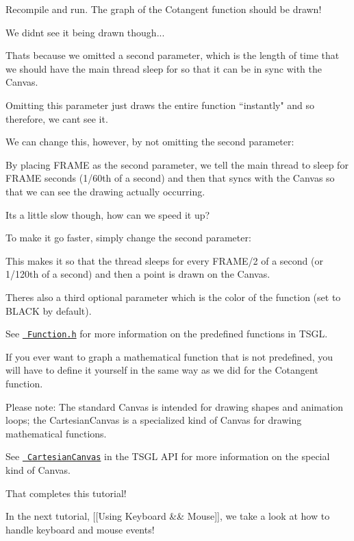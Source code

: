 Recompile and run. The graph of the {\ttfamily Cotangent} function should be drawn!

We didn\textquotesingle{}t see it being drawn though...

That\textquotesingle{}s because we omitted a second parameter, which is the length of time that we should have the main thread sleep for so that it can be in sync with the Canvas.

Omitting this parameter just draws the entire function “instantly" and so therefore, we can\textquotesingle{}t see it.

We can change this, however, by not omitting the second parameter\+:


\begin{DoxyCode}{0}
\end{DoxyCode}


By placing {\ttfamily F\+R\+A\+ME} as the second parameter, we tell the main thread to sleep for {\ttfamily F\+R\+A\+ME} seconds (1/60th of a second) and then that syncs with the Canvas so that we can see the drawing actually occurring.

It\textquotesingle{}s a little slow though, how can we speed it up?

To make it go faster, simply change the second parameter\+:


\begin{DoxyCode}{0}
\end{DoxyCode}


This makes it so that the thread sleeps for every {\ttfamily F\+R\+A\+M\+E/2} of a second (or 1/120th of a second) and then a point is drawn on the Canvas.

There\textquotesingle{}s also a third optional parameter which is the color of the function (set to {\ttfamily B\+L\+A\+CK} by default).

See \href{http://calvin-cs.github.io/TSGL/html/classtsgl_1_1_function.html}{\texttt{ Function.\+h}} for more information on the predefined functions in T\+S\+GL.

If you ever want to graph a mathematical function that is not predefined, you will have to define it yourself in the same way as we did for the {\ttfamily Cotangent} function.

Please note\+: The standard Canvas is intended for drawing shapes and animation loops; the Cartesian\+Canvas is a specialized kind of Canvas for drawing mathematical functions.

See \href{http://calvin-cs.github.io/TSGL/html/classtsgl_1_1_cartesian_canvas.html}{\texttt{ Cartesian\+Canvas}} in the T\+S\+GL A\+PI for more information on the special kind of Canvas.

That completes this tutorial!

In the next tutorial, \mbox{[}\mbox{[}Using Keyboard \&\& Mouse\mbox{]}\mbox{]}, we take a look at how to handle keyboard and mouse events! 